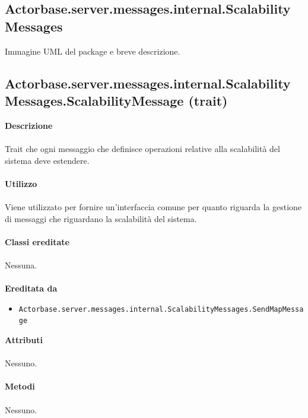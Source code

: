 \documentclass[a4paper]{article}
\begin{document}
	\subsection{Actorbase.server.messages.internal.ScalabilityMessages}
		Immagine UML del package e breve descrizione.
		
	\subsection{Actorbase.server.messages.internal.ScalabilityMessages.ScalabilityMessage (trait)}
		\textbf{Descrizione}
			\\ \\
			Trait che ogni messaggio che definisce operazioni relative alla scalabilità del sistema deve estendere.
			\\ \\
		\textbf{Utilizzo}
			\\ \\
			Viene utilizzato per fornire un'interfaccia comune per quanto riguarda la gestione di messaggi che riguardano la scalabilità del sistema.
			\\ \\
		\textbf{Classi ereditate}
			\\ \\
			Nessuna.
			\\ \\
		\textbf{Ereditata da}
			\begin{itemize}
				\item \texttt{Actorbase.server.messages.internal.ScalabilityMessages.SendMapMessage}
			\end{itemize}
		\textbf{Attributi}
			\\ \\
			Nessuno.
			\\ \\
		\textbf{Metodi}
			\\ \\
			Nessuno.
			
\end{document}

